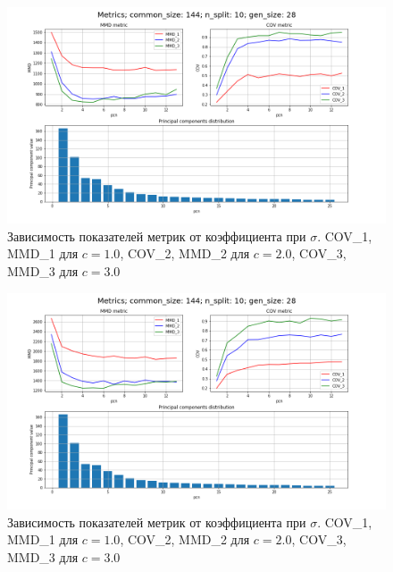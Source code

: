 \begin{figure}[h]
\includegraphics[width=1\linewidth]{images/c_diff_3_44.png}
\caption{Зависимость показателей метрик от коэффициента при $\sigma$. 
COV\_1, MMD\_1 для $c = 1.0$,  COV\_2, MMD\_2 для $c = 2.0$,  COV\_3, MMD\_3 для $c = 3.0$}
\label{fig:c_diff_1}
\end{figure}


\begin{figure}[h]
\includegraphics[width=1\linewidth]{images/c_diff_3_45.png}
\caption{Зависимость показателей метрик от коэффициента при $\sigma$.
COV\_1, MMD\_1 для $c = 1.0$,  COV\_2, MMD\_2 для $c = 2.0$,  COV\_3, MMD\_3 для $c = 3.0$}
\label{fig:c_diff_2}
\end{figure}

